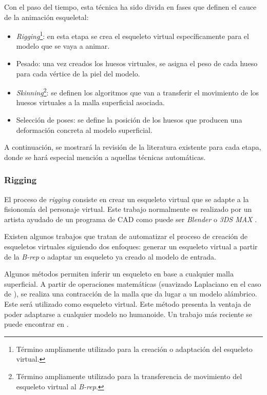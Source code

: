 Con el paso del tiempo, esta técnica ha sido divida en fases que definen el cauce de la animación esqueletal:

\begin{itemize}
    \item \emph{Rigging}\footnote{Término ampliamente utilizado para la creación o adaptación del esqueleto virtual.}: en esta etapa se crea el esqueleto virtual específicamente para el modelo que se vaya a animar.
    \item Pesado: una vez creados los huesos virtuales, se asigna el peso %
    de cada hueso para cada vértice de la piel del modelo.
    \item \emph{Skinning}\footnote{Término ampliamente utilizado para la transferencia de movimiento del esqueleto virtual al \emph{\acs{B-rep}}.}: se definen los algoritmos que van a transferir el movimiento de los huesos virtuales a la malla superficial asociada. 
    \item Selección de poses: se define la posición de los huesos que producen una deformación concreta al modelo superficial.
\end{itemize}

A continuación, se mostrará la revisión de la literatura existente para cada etapa, donde se hará especial mención a aquellas técnicas automáticas.


\subsubsection{Rigging}
\label{art:rigging}

El proceso de \emph{rigging} consiste en crear un esqueleto virtual que se adapte a la fisionomía del personaje virtual. Este trabajo normalmente es realizado por un artista ayudado de un programa de \ac{CAD} como puede ser \emph{Blender} \cite{blender} o \emph{3DS MAX} \cite{3ds}. 

Existen algunos trabajos que tratan de automatizar el proceso de creación de esqueletos virtuales siguiendo dos enfoques: generar un esqueleto virtual a partir de la \emph{\ac{B-rep}} o adaptar un esqueleto ya creado al modelo de entrada.

Algunos métodos permiten inferir un esqueleto en base a cualquier malla superficial. A partir de operaciones matemáticas (suavizado Laplaciano en el caso de \cite{laplacian}), se realiza una contracción de la malla que da lugar a un modelo alámbrico. Este será utilizado como esqueleto virtual. Este método presenta la ventaja de poder adaptarse a cualquier modelo no humanoide. Un trabajo más reciente se puede encontrar en \cite{Tagliasacchi}.

